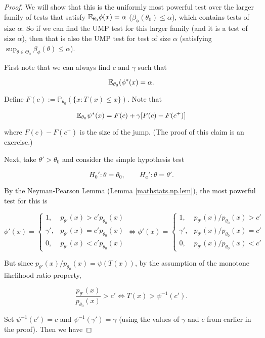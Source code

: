 \begin{proof}

We will show that this is the uniformly most powerful test over the larger family of tests that satisfy \(\E_{\theta_0} \phi(x) = \alpha\) (\(\beta_\phi(\theta_0) \leq \alpha\)), which contains tests of size \(\alpha\). So if we can find the UMP test for this larger family (and it is a test of size \(\alpha\)), then that is also the UMP test for test of size \(\alpha\) (satisfying \(\sup_{\theta \in \Theta_0} \beta_\phi(\theta) \leq \alpha\)).

First note that we can always find \(c\) and \(\gamma\) such that 

\[
\E_{\theta_0}(\phi^*(x) = \alpha.
\]

Define \(F(c) := \mathbb{P}_{\theta_0}( \{x: T(x) \leq x\})\). Note that

\[
\E_{\theta_0}\psi^*(x) = F(c) + \gamma[F(c) - F(c^+)]
\]

where \(F(c) - F(c^+)\) is the size of the jump. (The proof of this claim is an exercise.) 

Next, take \(\theta' > \theta_0\) and consider the simple hypothesis test

\[
H_{0}': \theta = \theta_0, \qquad H_a': \theta = \theta'.
\]

By the Neyman-Pearson Lemma (Lemma \ref{mathstats.np.lem}), the most powerful test for this is 

\[
\phi'(x) = \begin{cases}
1, & p_{\theta'}(x) > c' p_{\theta_0}(x) \\
\gamma', &  p_{\theta'}(x) = c' p_{\theta_0}(x) \\
0, & p_{\theta'}(x) < c' p_{\theta_0}(x) 
\end{cases} \iff 
\phi'(x) = \begin{cases}
1, & p_{\theta'}(x)/  p_{\theta_0}(x) > c' \\
\gamma', &  p_{\theta'}(x)/  p_{\theta_0}(x) = c' \\
0, & p_{\theta'}(x)/ p_{\theta_0}(x)  < c' 
\end{cases}
\]

But since \( p_{\theta'}(x)/  p_{\theta_0}(x)  = \psi(T(x))\), by the assumption of the monotone likelihood ratio property,

\[
\frac{p_{\theta'}(x)}{  p_{\theta_0}(x)} > c' \iff T(x) > \psi^{-1}(c').
\]

Set \(\psi^{-1}(c') = c\) and \(\psi^{-1}(\gamma') = \gamma\) (using the values of \(\gamma\) and \(c\) from earlier in the proof). Then we have


\end{proof}

